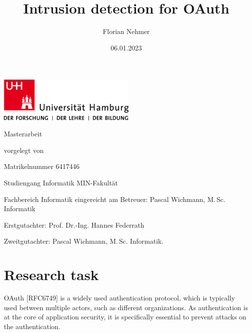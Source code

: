 \documentclass[
    fontsize=12pt,
    headings=small,
    parskip=half,           %
    bibliography=totoc,
    numbers=noenddot,       %
    open=any,               %
    ]{scrreprt}
\title{Intrusion detection for OAuth}
\author{Florian Nehmer}
\date{06.01.2023} %
\begin{document}
\begin{titlepage}%
	\includegraphics[width=6.8cm]{./pic/up-uhh-logo-u-2010-u-farbe-u-rgb.pdf}
	\begin{center}\Large
		\vfill
		Masterarbeit
		\vfill
		\makeatletter
		{\Large\textsf{\textbf{\@title}}\par}
		\makeatother
		\vfill
		vorgelegt von
		\par\bigskip
		\makeatletter
		{\@author} \par
		\makeatother
		Matrikelnummer 6417446 \par
		Studiengang Informatik
		\vfill
		MIN-Fakultät \par
		Fachbereich Informatik
		\vfill
		\makeatletter
		eingereicht am {\@date}
		\makeatother
		\vfill
		Betreuer: Pascal Wichmann, M.\,Sc. Informatik \par
		Erstgutachter: Prof. Dr.-Ing. Hannes Federrath \par
		Zweitgutachter: Pascal Wichmann, M.\,Sc. Informatik.
	\end{center}
\end{titlepage}%

\chapter*{Research task}
OAuth [RFC6749] is a widely used authentication protocol, which is typically used between multiple actors, such as different organizations. As authentication is at the core of application security, it is specifically essential to prevent attacks on the authentication.
\end{document}
